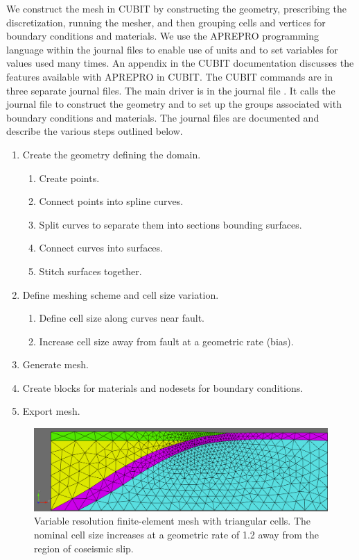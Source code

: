 We construct the mesh in CUBIT by constructing the geometry, prescribing
the discretization, running the mesher, and then grouping cells and
vertices for boundary conditions and materials. We use the APREPRO
programming language within the journal files to enable use of units
and to set variables for values used many times. An appendix in the
CUBIT documentation discusses the features available with APREPRO
in CUBIT. The CUBIT commands are in three separate journal files.
The main driver is in the journal file . It
calls the journal file  to construct the geometry
and  to set up the groups associated with boundary
conditions and materials. The journal files are documented and describe
the various steps outlined below.
\begin{enumerate}
\item Create the geometry defining the domain.
  \begin{enumerate}
  \item Create points.
  \item Connect points into spline curves.
  \item Split curves to separate them into sections bounding surfaces. 
  \item Connect curves into surfaces.
  \item Stitch surfaces together.
  \end{enumerate}
\item Define meshing scheme and cell size variation.
  \begin{enumerate}
  \item Define cell size along curves near fault.
  \item Increase cell size away from fault at a geometric rate (bias).
  \end{enumerate}
\item Generate mesh.
\item Create blocks for materials and nodesets for boundary conditions.
\item Export mesh.
\end{enumerate}

\begin{figure}
  \includegraphics[width=4.5in]{examples/figs/subduction2d_tri3}
  \caption{Variable resolution finite-element mesh with triangular
    cells. The nominal cell size increases at a geometric rate of 1.2
    away from the region of coseismic slip.}
  \label{fig:example:subduction:2d:mesh}
\end{figure}


